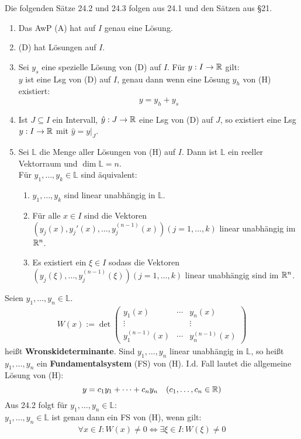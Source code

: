\documentclass[a4paper,twoside,DIV15,BCOR12mm,chapterprefix=true,headings=twolinechapter]{scrbook}
\begin{document}
Die folgenden Sätze 24.2 und 24.3 folgen aus 24.1 und den Sätzen aus §21.

\begin{satz}
\begin{enumerate}
\item Das AwP (A) hat auf $I$ genau eine Lösung.
\item (D) hat Lösungen auf $I$.
\item Sei $y_s$ eine spezielle Lösung von (D) auf $I$. Für $y:I\to\mathbb{R}$ gilt:\\
$y$ ist eine Lsg von (D) auf $I$, genau dann wenn eine Lösung $y_h$ von (H) existiert:
\[y=y_h+y_s\]
\item Ist $J\subseteq I$ ein Intervall, $\hat y:J\to\mathbb{R}$ eine Lsg von (D) auf $J$,
so existiert eine Lsg $y:I\to\mathbb{R}$ mit $\hat y=y|_J$.
\item Sei $\mathbb{L}$ die Menge aller Lösungen von (H) auf $I$. Dann ist $\mathbb{L}$
ein reeller Vektorraum und $\dim\mathbb{L}=n$.\\
Für $y_1,\ldots,y_k\in\mathbb{L}$ sind äquivalent:
\begin{enumerate}
\item $y_1,\ldots,y_k$ sind linear unabhängig in $\mathbb{L}$.
\item Für alle $x\in I$ sind die Vektoren $(y_j(x),y_j'(x),\ldots,y_j^{(n-1)}(x)) (j=1,\ldots,k)$
linear unabhängig im $\mathbb{R}^n$.
\item Es existiert ein $\xi\in I$ sodass die Vektoren $(y_j(\xi),\ldots,y_j^{(n-1)}(\xi)) (j=1,\ldots,k)$
linear unabhängig sind im $\mathbb{R}^n$.
\end{enumerate}
\end{enumerate}
\end{satz}

\begin{definition}
Seien $y_1,\ldots,y_n\in\mathbb{L}$.
\begin{align*}
W(x):= \det\begin{pmatrix}
y_1(x)&\cdots&y_n(x)\\
\vdots& &\vdots\\
y_1^{(n-1)}(x)&\cdots&y_n^{(n-1)}(x)
\end{pmatrix}
\end{align*}
heißt \textbf{Wronskideterminante}. Sind $y_1,\ldots,y_n$ linear unabhängig in $\mathbb{L}$,
so heißt $y_1,\ldots,y_n$ ein \textbf{Fundamentalsystem} (FS) von (H). I.d. Fall 
lautet die allgemeine Lösung von (H):
\[y=c_1y_1+\cdots+c_ny_n \quad (c_1,\ldots,c_n\in\mathbb{R})\]
Aus 24.2 folgt für $y_1,\ldots,y_n\in\mathbb{L}$:\\
$y_1,\ldots,y_n\in\mathbb{L}$ ist genau dann ein FS von (H), wenn gilt:
\begin{align*}
\forall x\in I: W(x)\ne 0 \iff \exists\xi\in I:W(\xi)\ne 0
\end{align*}
\end{definition}
\end{document}
